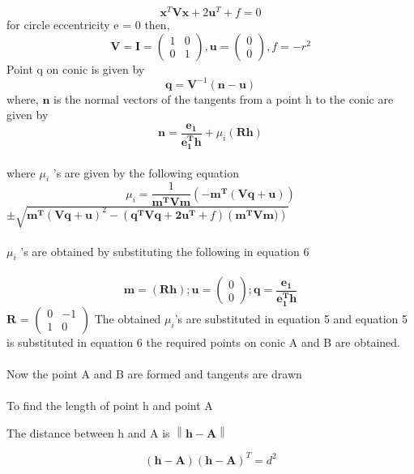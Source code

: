 \documentclass[journal,10pt,twocolumn]{article}
\providecommand{\norm}[1]{\left\lVert#1\right\rVert}
\let\vec\mathbf
\newcommand{\myvec}[1]{\ensuremath{\begin{pmatrix}#1\end{pmatrix}}}
\begin{document}
\begin{equation}
	\vec{x}^T\vec{V}\vec{x} + 2\vec{u}^T + f = 0
\end{equation}
	for circle eccentricity e = 0 then,\\
\begin{equation}
	\vec{V} = \vec{I} = \myvec{1&0\\0&1} , \vec{u} = \myvec{0\\0} , f = -r^2
\end{equation}
Point q on conic is given by 
\begin{equation}
	\vec{q} = \vec{V}^{-1}(\vec{n} - \vec{u})
\end{equation}
where, $\vec{n}$ is the normal vectors of the tangents from a point h to the conic are given by 
\begin{equation}
	\vec{n} = \frac{\vec{e_1}}{\vec{e_1^Th}} + \mu_i(\vec{Rh})
\end{equation}
\\
where $\mu _i$ 's are given by the following equation
\begin{equation}
	\mu_i = \frac{1}{\vec{{m^TVm}}}(\vec{-m^T(Vq+u)})	
\end{equation}
	 			$ \pm \sqrt{\vec{m^T(Vq+u)}^2 - (\vec{q^TVq + 2u^T} + f)(\vec{m^TVm)})}$
\\\\
$\mu _i$ 's are obtained by substituting the following in equation 6\\\\
\begin{equation}
	\vec{m} = (\vec{Rh})  ;  \vec{u}  = \myvec{0\\0}  ;  \vec{q} = \frac{\vec{e_1}}{\vec{e_1^Th}}
\end{equation}
 $\vec{R}$ = $\myvec{0&-1\\1&0}$ 
The obtained $\mu_i$'s are substituted in equation 5 and equation 5 is substituted in equation 6 the required points on conic A and B are obtained.\\\\
Now the point A and B are formed and tangents are drawn \\\\
To find the length of point h and point A \\
\begin{center}
	The distance between h and A is $\norm{\vec{h}-\vec{A}}$\\
\end{center}
\begin{equation}
  (\vec{h}-\vec{A})(\vec{h}-\vec{A})^T=d^2
\end{equation}
\end{document}
